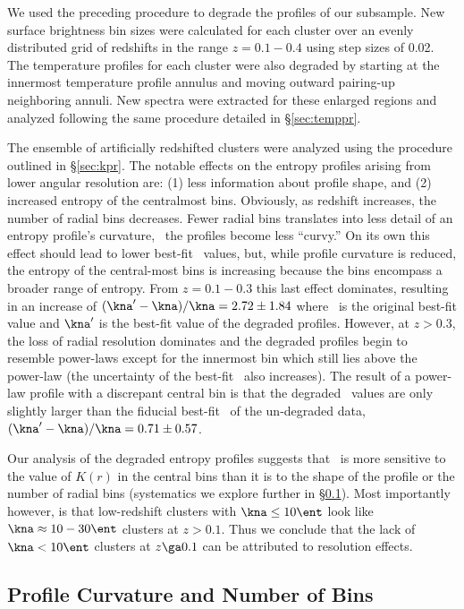 \documentclass[apj]{emulateapj}
\begin{document}
We used the preceding procedure to degrade the profiles of our
subsample. New surface brightness bin sizes were calculated for each
cluster over an evenly distributed grid of redshifts in the range $z =
0.1-0.4$ using step sizes of 0.02. The temperature profiles for each
cluster were also degraded by starting at the innermost temperature
profile annulus and moving outward pairing-up neighboring annuli. New
spectra were extracted for these enlarged regions and analyzed
following the same procedure detailed in \S\ref{sec:temppr}.

The ensemble of artificially redshifted clusters were analyzed using
the procedure outlined in \S\ref{sec:kpr}. The notable effects on the
entropy profiles arising from lower angular resolution are: (1) less
information about profile shape, and (2) increased entropy of the
centralmost bins. Obviously, as redshift increases, the number of
radial bins decreases. Fewer radial bins translates into less detail
of an entropy profile's curvature, \eg\ the profiles become less
``curvy.'' On its own this effect should lead to lower best-fit
\kna\ values, but, while profile curvature is reduced, the entropy of
the central-most bins is increasing because the bins encompass a
broader range of entropy. From $z = 0.1-0.3$ this last effect
dominates, resulting in an increase of $\dkna = 2.72 \pm 1.84$ where
\kna\ is the original best-fit value and $\kna^{\prime}$ is the
best-fit value of the degraded profiles. However, at $z > 0.3$, the
loss of radial resolution dominates and the degraded profiles begin to
resemble power-laws except for the innermost bin which still lies
above the power-law (the uncertainty of the best-fit
\kna\ also increases). The result of a power-law profile with a
discrepant central bin is that the degraded \kna\ values are only
slightly larger than the fiducial best-fit \kna\ of the un-degraded
data, $\dkna = 0.71 \pm 0.57$.

Our analysis of the degraded entropy profiles suggests that \kna\ is
more sensitive to the value of $K(r)$ in the central bins than it is
to the shape of the profile or the number of radial bins (systematics
we explore further in \S\ref{sec:curve}). Most importantly however, is
that low-redshift clusters with $\kna \le 10 \ent$ look like $\kna
\approx 10-30 \ent$ clusters at $z > 0.1$. Thus we conclude that the
lack of $\kna < 10 \ent$ clusters at $z \ga 0.1$ can be attributed to
resolution effects.

\subsection{Profile Curvature and Number of Bins}
\label{sec:curve}
\end{document}
